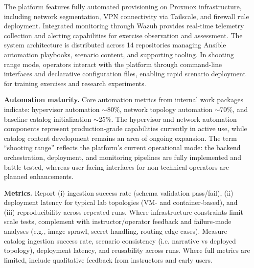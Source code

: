 \documentclass[11pt]{article}
\begin{document}
The platform features fully automated provisioning on Proxmox infrastructure, including network segmentation, VPN connectivity via Tailscale, and firewall rule deployment.
Integrated monitoring through Wazuh provides real-time telemetry collection and alerting capabilities for exercise observation and assessment.
The system architecture is distributed across 14 repositories managing Ansible automation playbooks, scenario content, and supporting tooling.
In shooting range mode, operators interact with the platform through command-line interfaces and declarative configuration files, enabling rapid scenario deployment for training exercises and research experiments.

\textbf{Automation maturity.} 
Core automation metrics from internal work packages indicate: 
hypervisor automation $\sim$80\%, 
network topology automation $\sim$70\%, 
and baseline catalog initialization $\sim$25\%.
The hypervisor and network automation components represent production-grade capabilities currently in active use,
while catalog content development remains an area of ongoing expansion.
The term ``shooting range'' reflects the platform's current operational mode: 
the backend orchestration, deployment, and monitoring pipelines are fully implemented and battle-tested,
whereas user-facing interfaces for non-technical operators are planned enhancements.

\textbf{Metrics.} 
Report (i) ingestion success rate (schema validation pass/fail), 
(ii) deployment latency for typical lab topologies (VM- and container-based), 
and (iii) reproducibility across repeated runs.
Where infrastructure constraints limit scale tests, 
complement with instructor/operator feedback and failure-mode analyses 
(e.g., image sprawl, secret handling, routing edge cases).
Measure catalog ingestion success rate, 
scenario consistency (i.e. narrative vs deployed topology), 
deployment latency, 
and reusability across runs. 
Where full metrics are limited, 
include qualitative feedback from instructors and early users.
\end{document}
